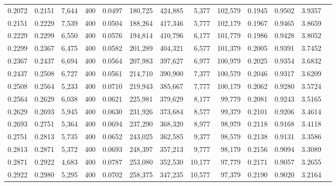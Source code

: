 \begin{tabular}{rrrrrrrrrrrrr}
0.2072 & 0.2151 &  7,644 &   400 &                                     0.0497 & 180,725 & 424,885 &   5,377 & 102,579 & 0.1945 & 0.9502 & 3.9357 \\
0.2151 & 0.2229 &  7,539 &   400 &                                     0.0504 & 188,264 & 417,346 &   5,777 & 102,179 & 0.1967 & 0.9465 & 3.8659 \\
0.2229 & 0.2299 &  6,550 &   400 &                                     0.0576 & 194,814 & 410,796 &   6,177 & 101,779 & 0.1986 & 0.9428 & 3.8052 \\
0.2299 & 0.2367 &  6,475 &   400 &                                     0.0582 & 201,289 & 404,321 &   6,577 & 101,379 & 0.2005 & 0.9391 & 3.7452 \\
0.2367 & 0.2437 &  6,694 &   400 &                                     0.0564 & 207,983 & 397,627 &   6,977 & 100,979 & 0.2025 & 0.9354 & 3.6832 \\
0.2437 & 0.2508 &  6,727 &   400 &                                     0.0561 & 214,710 & 390,900 &   7,377 & 100,579 & 0.2046 & 0.9317 & 3.6209 \\
0.2508 & 0.2564 &  5,233 &   400 &                                     0.0710 & 219,943 & 385,667 &   7,777 & 100,179 & 0.2062 & 0.9280 & 3.5724 \\
0.2564 & 0.2629 &  6,038 &   400 &                                     0.0621 & 225,981 & 379,629 &   8,177 &  99,779 & 0.2081 & 0.9243 & 3.5165 \\
0.2629 & 0.2693 &  5,945 &   400 &                                     0.0630 & 231,926 & 373,684 &   8,577 &  99,379 & 0.2101 & 0.9206 & 3.4614 \\
0.2693 & 0.2751 &  5,364 &   400 &                                     0.0694 & 237,290 & 368,320 &   8,977 &  98,979 & 0.2118 & 0.9168 & 3.4118 \\
0.2751 & 0.2813 &  5,735 &   400 &                                     0.0652 & 243,025 & 362,585 &   9,377 &  98,579 & 0.2138 & 0.9131 & 3.3586 \\
0.2813 & 0.2871 &  5,372 &   400 &                                     0.0693 & 248,397 & 357,213 &   9,777 &  98,179 & 0.2156 & 0.9094 & 3.3089 \\
0.2871 & 0.2922 &  4,683 &   400 &                                     0.0787 & 253,080 & 352,530 &  10,177 &  97,779 & 0.2171 & 0.9057 & 3.2655 \\
0.2922 & 0.2980 &  5,295 &   400 &                                     0.0702 & 258,375 & 347,235 &  10,577 &  97,379 & 0.2190 & 0.9020 & 3.2164 \\

\end{tabular}
